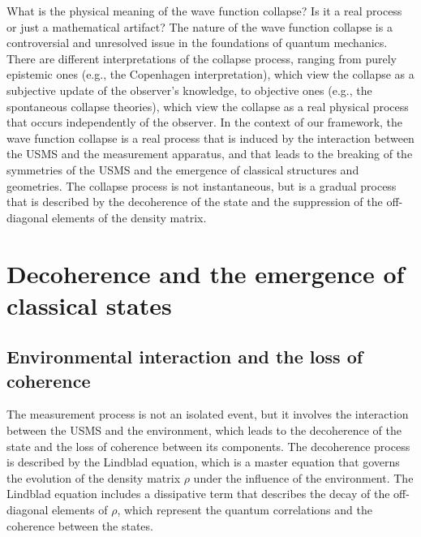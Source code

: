 \begin{tcolorbox}[colback=green!5!white,colframe=green!75!black,title=Question]
What is the physical meaning of the wave function collapse? Is it a real process or just a mathematical artifact?
\tcblower
The nature of the wave function collapse is a controversial and unresolved issue in the foundations of quantum mechanics. There are different interpretations of the collapse process, ranging from purely epistemic ones (e.g., the Copenhagen interpretation), which view the collapse as a subjective update of the observer's knowledge, to objective ones (e.g., the spontaneous collapse theories), which view the collapse as a real physical process that occurs independently of the observer. In the context of our framework, the wave function collapse is a real process that is induced by the interaction between the USMS and the measurement apparatus, and that leads to the breaking of the symmetries of the USMS and the emergence of classical structures and geometries. The collapse process is not instantaneous, but is a gradual process that is described by the decoherence of the state and the suppression of the off-diagonal elements of the density matrix.
\end{tcolorbox}

\section{Decoherence and the emergence of classical states}
\subsection{Environmental interaction and the loss of coherence}
The measurement process is not an isolated event, but it involves the interaction between the USMS and the environment, which leads to the decoherence of the state and the loss of coherence between its components. The decoherence process is described by the Lindblad equation, which is a master equation that governs the evolution of the density matrix $\rho$ under the influence of the environment. The Lindblad equation includes a dissipative term that describes the decay of the off-diagonal elements of $\rho$, which represent the quantum correlations and the coherence between the states.

